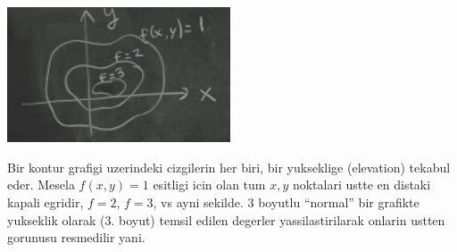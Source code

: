 \documentclass[12pt,fleqn]{article}
\begin{document}
\includegraphics[height=4cm]{8_7.png}

Bir kontur grafigi uzerindeki cizgilerin her biri, bir yukseklige
(elevation) tekabul eder. Mesela $f(x,y)=1$ esitligi icin olan tum $x,y$
noktalari ustte en distaki kapali egridir, $f=2$, $f=3$, vs ayni sekilde. 3
boyutlu ``normal'' bir grafikte yukseklik olarak (3. boyut) temsil edilen
degerler yassilastirilarak onlarin ustten gorunusu resmedilir yani. 
\end{document}
